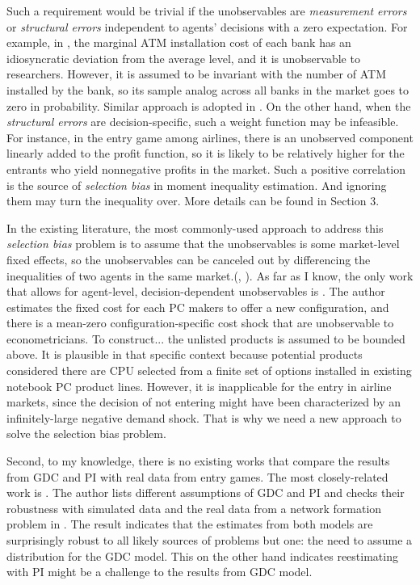 \documentclass[a4paper]{article}
\begin{document}
Such a requirement would be trivial if the unobservables are \textit{measurement errors} or {\color{red} \textit{structural errors} independent} to agents' decisions with a zero expectation. For example, in \cite{ishii2008compatibility}, the marginal ATM installation cost of each bank has an idiosyncratic deviation from the average level, and it is unobservable to researchers. However, it is assumed to be invariant with the number of ATM installed by the bank, so its sample analog across all banks in the market goes to zero in probability. Similar approach is adopted in \cite{ho2009insurer}. On the other hand, when the \textit{structural errors} are decision-specific, such a weight function may be infeasible. For instance, in the entry game among airlines, there is an unobserved component linearly added to the profit function, so it is likely to be relatively higher for the entrants who yield nonnegative profits in the market. Such a positive correlation is the source of \textit{selection bias} in moment inequality estimation. And ignoring them may turn the inequality over. More details can be found in Section 3.


In the existing literature, the most commonly-used approach to address this \textit{selection bias} problem is to assume that the unobservables is some market-level fixed effects, so the unobservables can be canceled out by differencing the inequalities of two agents in the same market.(\cite{ellickson2013estimating}, \cite{ho2014hospital}). As far as I know, the only work that allows for agent-level, decision-dependent unobservables is \cite{eizenberg2014upstream}. The author estimates the fixed cost for each PC makers to offer a new configuration, and there is a mean-zero configuration-specific cost shock that are unobservable to econometricians. {\color{red}To construct...} the unlisted products is assumed to be bounded above. It is plausible in that specific context because potential products considered there are CPU selected from a finite set of options installed in existing notebook PC product lines. However, it is inapplicable for the entry in airline markets, since the decision of not entering might have been characterized by an infinitely-large negative demand shock. That is why we need a new approach to solve the selection bias problem.

Second, to my knowledge, there is no existing works that compare the results from GDC and PI with real data from entry games. The most closely-related work is \cite{pakes2010alternative}. The author lists different assumptions of GDC and PI and checks their robustness with simulated data and the real data from a network formation problem in  \cite{ho2009insurer}. The result indicates that the estimates from both models are surprisingly robust to all likely sources of problems but one: the need to assume a distribution for the GDC model. This on the other hand indicates reestimating \cite{ciliberto2009market} with PI might be a challenge to the results from GDC model.
\end{document}
